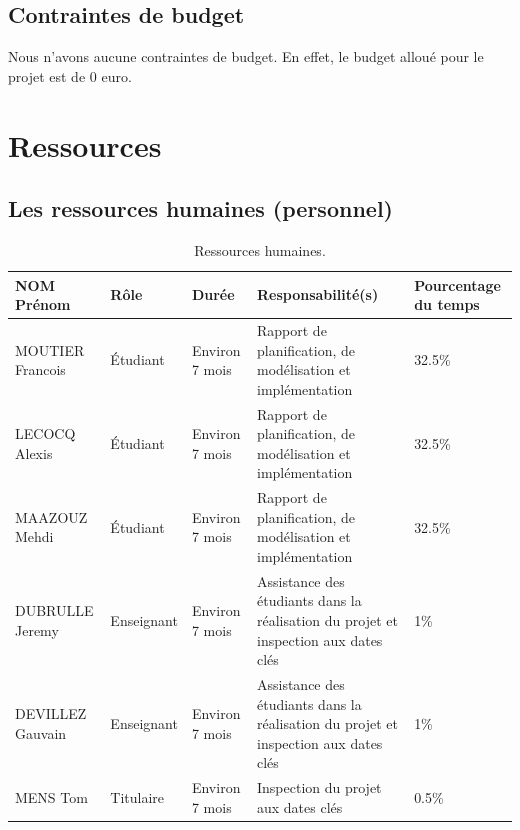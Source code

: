 \documentclass[]{article}
\begin{document}
\subsection{Contraintes de budget}

Nous n'avons aucune contraintes de budget. En effet, le budget alloué pour le projet est de 0 euro. 

\newpage
\section{Ressources}\label{sec:organisation}

\subsection{Les ressources humaines (personnel)}
\begin{table}[!htbp]
\begin{center}
\begin{tabular}{p{3cm}|p{1.5cm}|p{2.5cm}|p{5cm}|p{2cm}}
\textbf{NOM Prénom} & \textbf{R\^ole} & \textbf{Durée} & \textbf{Responsabilité(s)} & \textbf{Pourcentage du temps}\\
\hline
MOUTIER Francois & Étudiant & Environ 7 mois & Rapport de planification, de modélisation et implémentation & 32.5\%\\
\hline
LECOCQ Alexis & Étudiant & Environ 7 mois & Rapport de planification, de modélisation et implémentation & 32.5\%\\
\hline
MAAZOUZ Mehdi & Étudiant & Environ 7 mois & Rapport de planification, de modélisation et implémentation & 32.5\%\\
\hline
DUBRULLE Jeremy & Enseignant & Environ 7 mois & Assistance des étudiants dans la réalisation du projet et inspection aux dates clés & 1\%\\
\hline
DEVILLEZ Gauvain & Enseignant & Environ 7 mois & Assistance des étudiants dans la réalisation du projet et inspection aux dates clés & 1\%\\
\hline
MENS Tom & Titulaire & Environ 7 mois & Inspection du projet aux dates clés & 0.5\%\\
\end{tabular}
\end{center}
   \caption{Ressources humaines.}
   \label{tab:RH}
\end{table}
\end{document}
